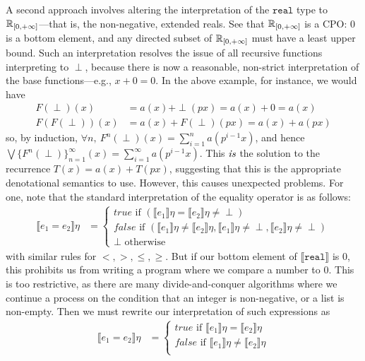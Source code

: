 A second approach involves altering the interpretation of the $\texttt{real}$ type to 
$\mathbb{R}_{[0,+\infty]}$---that is, the non-negative, extended reals. See that $\mathbb{R}_{[0,+\infty]}$ is a CPO: $0$ is a bottom element,
and any directed subset of $\mathbb{R}_{[0,+\infty]}$ must have a least upper bound. Such an interpretation
resolves the issue of all recursive functions interpreting to $\perp$, because there is now a reasonable, non-strict
interpretation of the base functions---e.g., $x + 0 = 0$. In the above example, for instance, we would have
\begin{align*}
F(\perp)(x) &= a(x) + \perp(px) = a(x) + 0 = a(x) \\
F(F(\perp))(x) &= a(x) + F(\perp)(px) = a(x) + a(px)
\end{align*}
so, by induction, 
$\forall n, \ F^n(\perp)(x) = \sum_{i=1}^{n}a(p^{i-1}x)$, and hence $\bigvee\{F^n(\perp)\}^{\infty}_{n=1}(x) = \sum_{i=1}
^{\infty}a(p^{i-1}x)$. This $\emph{is}$ the solution to the recurrence $T(x) = a(x) + T(px)$, suggesting that this is the 
appropriate denotational semantics to use. However, this causes unexpected problems. For one, note that
 the standard interpretation of the equality operator is as follows:
\begin{align*}
 \llbracket e_1 = e_2 \rrbracket\eta &= 
 \begin{cases} 
      true \text{ if } (\llbracket e_1 \rrbracket\eta = \llbracket e_2 \rrbracket\eta \neq \perp) \\
      false \text{  if } (\llbracket e_1 \rrbracket\eta \neq \llbracket e_2\rrbracket\eta, \llbracket e_1 \rrbracket\eta \neq \perp, \llbracket e_2 \rrbracket\eta \neq \perp)\\
      \perp \text{ otherwise}
   \end{cases} 
\end{align*}
with similar rules for $<, >, \leq, \geq$. But if our bottom element of $\llbracket \texttt{real} \rrbracket$ is $0$, this 
prohibits us from writing a program where we compare a number to $0$. This is too restrictive, as there are many 
divide-and-conquer algorithms where we continue a process on the condition that an integer is non-negative, or a 
list is non-empty. Then we must rewrite our interpretation of such expressions as
\begin{align*}
 \llbracket e_1 = e_2 \rrbracket\eta &= 
 \begin{cases} 
      true \text{ if } \llbracket e_1 \rrbracket\eta = \llbracket e_2 \rrbracket\eta \\
      false \text{  if } \llbracket e_1 \rrbracket\eta \neq \llbracket e_2\rrbracket\eta\\
   \end{cases} 
\end{align*}

